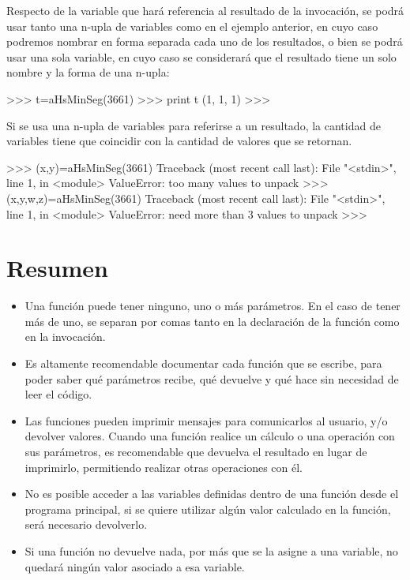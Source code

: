 Respecto de la variable que hará referencia al resultado de la invocación,
se podrá usar tanto una n-upla de variables como en el ejemplo anterior,
en cuyo caso podremos nombrar en forma separada cada uno de los resultados,
o bien se podrá usar una sola variable, en cuyo caso se considerará que
el resultado tiene un solo nombre y la forma de una n-upla:

\begin{codigo-python-sn}
>>> t=aHsMinSeg(3661)
>>> print t
(1, 1, 1)
>>>
\end{codigo-python-sn}

\begin{observacion}
Si se usa una n-upla de variables para referirse a un resultado,
la cantidad de variables tiene que coincidir con la cantidad de valores que
se retornan.

\begin{codigo-python-sn}
>>> (x,y)=aHsMinSeg(3661)
Traceback (most recent call last):
  File "<stdin>", line 1, in <module>
ValueError: too many values to unpack
>>> (x,y,w,z)=aHsMinSeg(3661)
Traceback (most recent call last):
  File "<stdin>", line 1, in <module>
ValueError: need more than 3 values to unpack
>>>
\end{codigo-python-sn}
\end{observacion}

\section{Resumen}

\begin{itemize}
\item Una función puede tener ninguno, uno o más parámetros.  En el
caso de tener más de uno, se separan por comas tanto en la declaración
de la función como en la invocación.
\item Es altamente recomendable documentar cada función que se
escribe, para poder saber qué parámetros recibe, qué devuelve y qué
hace sin necesidad de leer el código.
\item Las funciones pueden imprimir mensajes para comunicarlos al
usuario, y/o devolver valores.  Cuando una función realice un cálculo
o una operación con sus parámetros, es recomendable que devuelva el
resultado en lugar de imprimirlo, permitiendo realizar otras
operaciones con él.
\item No es posible acceder a las variables definidas dentro de una
función desde el programa principal, si se quiere utilizar algún
valor calculado en la función, será necesario devolverlo.
\item Si una función no devuelve nada, por más que se la asigne a una
variable, no quedará ningún valor asociado a esa variable.
\end{itemize}

